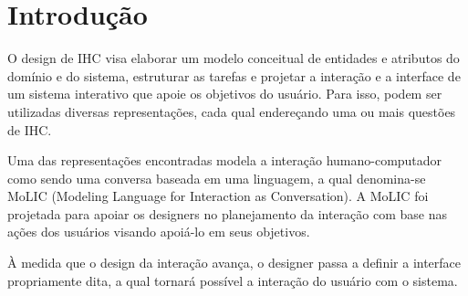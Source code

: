 \section{Introdução}

O design de IHC visa elaborar um modelo conceitual de entidades e atributos do
domínio e do sistema, estruturar as tarefas e projetar a interação e a interface
de um sistema interativo que apoie os objetivos do usuário. Para isso, podem ser
utilizadas diversas representações, cada qual endereçando uma ou mais questões
de IHC.


	Uma das representações encontradas modela a interação humano-computador
como sendo uma conversa baseada em uma linguagem, a qual denomina-se MoLIC
(Modeling Language for Interaction as Conversation). A MoLIC foi projetada para
apoiar os designers no planejamento da interação com base nas ações dos usuários
visando apoiá-lo em seus objetivos.


	À medida que o design da interação avança, o designer passa a definir a
interface propriamente dita, a qual tornará possível a interação do usuário com
o sistema.



